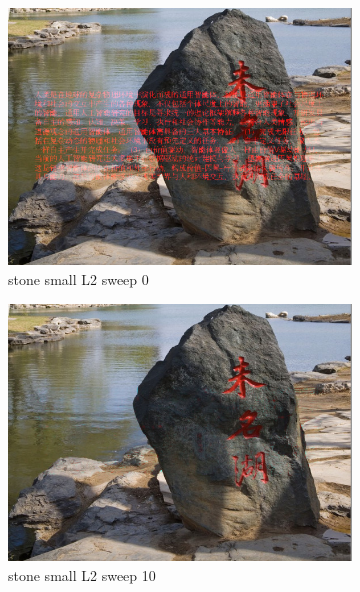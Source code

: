 \documentclass[11pt]{article}
\begin{document}
\begin{figure}[ht!]
    \centering
    \hfill%
    \begin{subfigure}[]{0.333\linewidth}
        \centering
        \includegraphics[width=\linewidth]{fig/restoration/stone_small/L2/gibbs_0.jpg}
        \caption{stone small L2 sweep 0}
    \end{subfigure}%
    \hfill%
    \begin{subfigure}[]{0.333\linewidth}
        \centering
        \includegraphics[width=\linewidth]{fig/restoration/stone_small/L2/gibbs_10.jpg}
        \caption{stone small L2 sweep 10}
    \end{subfigure}%
    \hfill%
    \begin{subfigure}[]{0.333\linewidth}

\end{subfigure}
\end{figure}
\end{document}
